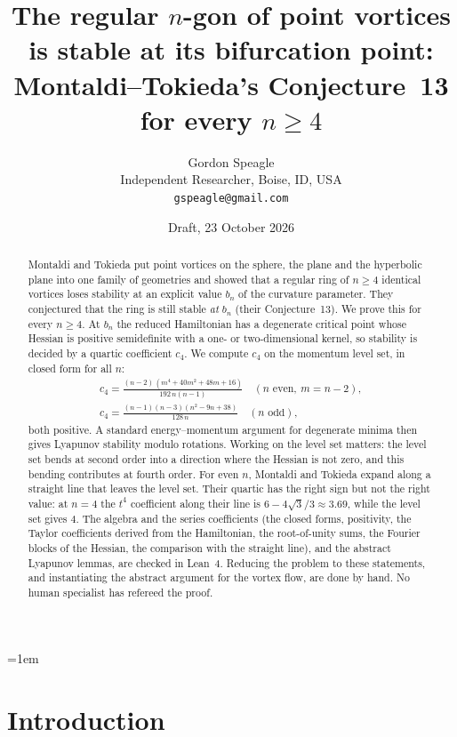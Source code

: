 \documentclass[11pt]{article}
\title{The regular $n$-gon of point vortices is stable at its bifurcation point:\\
Montaldi--Tokieda's Conjecture~13 for every $n\ge4$}
\author{Gordon Speagle\\
Independent Researcher, Boise, ID, USA\\
\texttt{gspeagle@gmail.com}}
\date{Draft, 23 October 2026}
\numberwithin{equation}{section}
\theoremstyle{definition}
\theoremstyle{remark}
\begin{document}
\emergencystretch=1em
\maketitle

\begin{abstract}
Montaldi and Tokieda put point vortices on the sphere, the plane and the hyperbolic plane into one
family of geometries and showed that a regular ring of $n\ge4$ identical vortices loses stability at an
explicit value $b_n$ of the curvature parameter. They conjectured that the ring is still stable \emph{at}
$b_n$ (their Conjecture~13). We prove this for every $n\ge4$. At $b_n$ the reduced Hamiltonian has a
degenerate critical point whose Hessian is positive semidefinite with a one- or two-dimensional kernel,
so stability is decided by a quartic coefficient $c_4$. We compute $c_4$ on the momentum level set, in
closed form for all $n$:
\begin{gather*}
c_4=\frac{(n-2)\,(m^4+40m^2+48m+16)}{192\,n(n-1)}\quad(n\text{ even},\ m=n-2),\\
c_4=\frac{(n-1)(n-3)(n^2-9n+38)}{128\,n}\quad(n\text{ odd}),
\end{gather*}
both positive. A standard energy--momentum argument for degenerate minima then gives Lyapunov stability
modulo rotations. Working on the level set matters: the level set bends at second order into a direction
where the Hessian is not zero, and this bending contributes at fourth order. For even $n$, Montaldi and
Tokieda expand along a straight line that leaves the level set. Their quartic has the right sign but not
the right value: at $n=4$ the $t^4$ coefficient along their line is $6-4\sqrt3/3\approx3.69$, while the
level set gives $4$. The
algebra and the series coefficients (the closed forms, positivity, the Taylor coefficients derived
from the Hamiltonian, the root-of-unity sums, the Fourier blocks of the Hessian, the comparison with the
straight line), and the abstract Lyapunov lemmas, are checked in Lean~4. Reducing the problem to these statements, and instantiating the
abstract argument for the vortex flow, are done by hand. No human specialist has refereed the proof.
\end{abstract}

\tableofcontents

\section{Introduction}\label{sec:intro}
\end{document}
